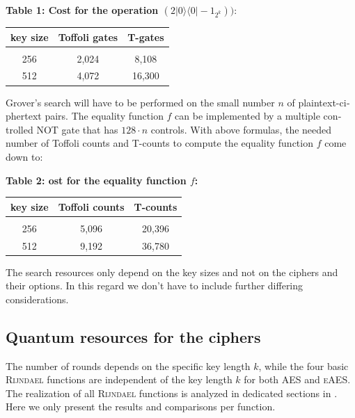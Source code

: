 \documentclass[a4paper,11pt]{article}
\begin{document}
\begin{otherlanguage}{english}
  \begin{center}
  \textbf{Table 1: Cost for the operation $(2 |0\rangle \langle 0| -1_{2^k}))$}: \\
  \vspace{0.2cm}
    \begin{tabular}{c|c|c}
    key size & Toffoli gates & T-gates \\
    \hline
      &  &  \\ [-8pt]
    256               &    2,024                &  8,108    \\ 
    512               &    4,072                &  16,300     \\  
    \end{tabular}
  \end{center}
  \vspace{0.5cm}

\noindent
Grover's search will have to be performed on the small number $n$ of plaintext-ciphertext pairs. The equality function $f$ can be implemented by a multiple controlled NOT gate that has $128\cdot n$ controls. With above formulas, the needed number of Toffoli counts and T-counts to compute the equality function $f$ come down to: 

\begin{center}
\textbf{Table 2: ost for the equality function $f$:} \\
  \vspace{0.2cm}
  \begin{tabular}{c|c|c}
  key size & Toffoli counts & T-counts \\ 
  \hline
    &  &  \\ [-8pt]
  256               &    5,096                &  20,396    \\
  512               &    9,192                &  36,780     \\  
  \end{tabular} 
\end{center}
\vspace{0.5cm}

\noindent
The search resources only depend on the key sizes and not on the ciphers and their options. In this regard we don't have to include further differing considerations.

\subsection{Quantum resources for the ciphers}
\noindent
The number of rounds depends on the specific key length $k$, while the four basic \textsc{Rijndael} functions are independent of the key length $k$ for both \textsc{AES} and \textsc{eAES}. The realization of all \textsc{Rijndael} functions is analyzed in dedicated sections in \cite{GRO}. Here we only present the results and comparisons per function.\\



\end{otherlanguage}
\end{document}
